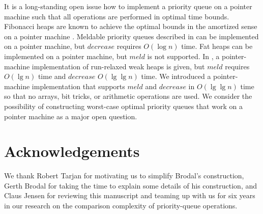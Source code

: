 \documentclass{llncs}
\newcommand{\Decrease}{\mbox{$\mathit{decrease}$}}
\newcommand{\Meld}{\mbox{$\mathit{meld}$}}
\begin{document}
It is a long-standing open issue how to implement a priority queue on
a pointer machine such that all operations are performed in optimal
time bounds.  Fibonacci heaps are known to achieve the optimal bounds
in the amortized sense on a pointer machine \cite{KT08}. Meldable
priority queues described in \cite{Bro95} can be implemented on a pointer
machine, but \Decrease{} requires $O(\log n)$ time.  Fat heaps
\cite{KST02} can be implemented on a pointer machine, but \Meld{} is
not supported.  In \cite{EJK10c}, a pointer-machine implementation of
run-relaxed weak heaps is given, but \Meld{} requires $O(\lg n)$ time
and \Decrease{} $O(\lg\lg n)$ time.  We introduced a pointer-machine
implementation that supports \Meld{} and \Decrease{} in $O(\lg\lg n)$
time so that no arrays, bit tricks, or arithmetic operations are used.
We consider the possibility of constructing worst-case optimal
priority queues that work on a pointer machine as a major open question.

\section*{Acknowledgements}

We thank Robert Tarjan for motivating us to simplify Brodal's
construction, Gerth Brodal for taking the time to explain some details
of his construction, and Claus Jensen for reviewing this manuscript
and teaming up with us for six years in our research on the comparison
complexity of priority-queue operations.
\end{document}
